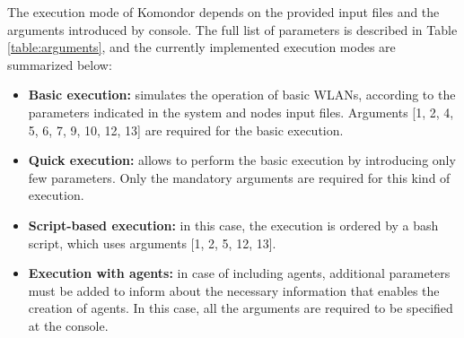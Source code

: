 \documentclass[a4paper]{article}
\begin{document}
The execution mode of Komondor depends on the provided input files and the arguments introduced by console. The full list of parameters is described in Table \ref{table:arguments}, and the currently implemented execution modes are summarized below:
\begin{itemize}
	\item \textbf{Basic execution:} simulates the operation of basic WLANs, according to the parameters indicated in the system and nodes input files. Arguments [1, 2, 4, 5, 6, 7, 9, 10, 12, 13] are required for the basic execution.
	\item \textbf{Quick execution:} allows to perform the basic execution by introducing only few parameters. Only the mandatory arguments are required for this kind of execution.
	\item \textbf{Script-based execution:} in this case, the execution is ordered by a bash script, which uses arguments [1, 2, 5, 12, 13].
	\item \textbf{Execution with agents:} in case of including agents, additional parameters must be added to inform about the necessary information that enables the creation of agents. In this case, all the arguments are required to be specified at the console.
\end{itemize}
 
\end{document}
